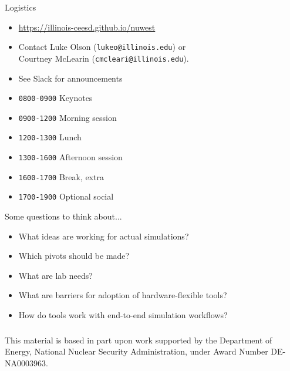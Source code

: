 \documentclass[aspectratio=169]{beamer}
\begin{document}
\begin{frame}{Logistics}
\begin{itemize}
\item \url{https://illinois-ceesd.github.io/nuwest}
\item Contact Luke Olson (\texttt{lukeo@illinois.edu}) or\\
  \hspace{1.25cm} Courtney McLearin (\texttt{cmcleari@illinois.edu}).
\item See Slack for announcements
\item {\color{IllinoisOrange} \texttt{0800-0900}} Keynotes
\item {\color{IllinoisOrange} \texttt{0900-1200}} Morning session
\item {\color{IllinoisOrange} \texttt{1200-1300}} Lunch
\item {\color{IllinoisOrange} \texttt{1300-1600}} Afternoon session
\item {\color{IllinoisOrange} \texttt{1600-1700}} Break, extra
\item {\color{IllinoisOrange} \texttt{1700-1900}} Optional social
\end{itemize}
\end{frame}

\begin{frame}{Some questions to think about...}

\begin{itemize}
\item What ideas are working for actual simulations?
\item Which pivots should be made?
\item What are lab needs?
\item What are barriers for adoption of hardware-flexible tools?
\item How do tools work with end-to-end simulation workflows?
\end{itemize}

\end{frame}

\begin{frame}\frametitle{}
\vspace*{0.2in}
\begin{center}
\vspace*{0.35in}


\vspace*{0.5in}
This material is based in part upon work supported by the Department of Energy, National Nuclear Security Administration, under Award Number DE-NA0003963. 
\end{center}
\end{frame}
\end{document}
